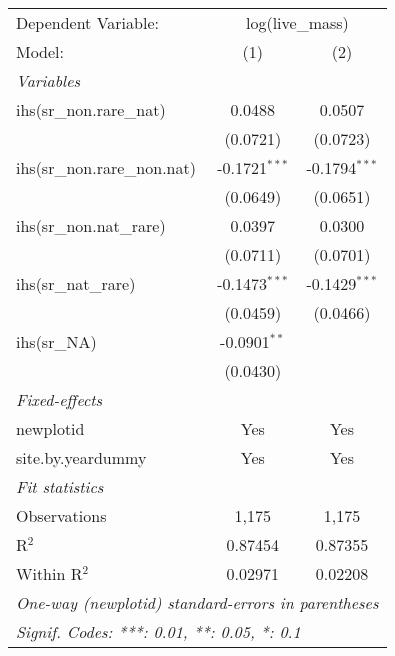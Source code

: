 \begin{tabular}{lcc}
\tabularnewline\midrule\midrule
Dependent Variable:&\multicolumn{2}{c}{log(live\_mass)}\\
Model:&(1) & (2)\\
\midrule \emph{Variables}&   &  \\
ihs(sr\_non.rare\_nat)&0.0488 & 0.0507\\
  &(0.0721) & (0.0723)\\
ihs(sr\_non.rare\_non.nat)&-0.1721$^{***}$ & -0.1794$^{***}$\\
  &(0.0649) & (0.0651)\\
ihs(sr\_non.nat\_rare)&0.0397 & 0.0300\\
  &(0.0711) & (0.0701)\\
ihs(sr\_nat\_rare)&-0.1473$^{***}$ & -0.1429$^{***}$\\
  &(0.0459) & (0.0466)\\
ihs(sr\_NA)&-0.0901$^{**}$ &   \\
  &(0.0430) &   \\
\midrule \emph{Fixed-effects}&   &  \\
newplotid & Yes & Yes\\
site.by.yeardummy & Yes & Yes\\
\midrule \emph{Fit statistics}&  & \\
Observations & 1,175&1,175\\
R$^2$ & 0.87454&0.87355\\
Within R$^2$ & 0.02971&0.02208\\
\midrule\midrule\multicolumn{3}{l}{\emph{One-way (newplotid) standard-errors in parentheses}}\\
\multicolumn{3}{l}{\emph{Signif. Codes: ***: 0.01, **: 0.05, *: 0.1}}\\
\end{tabular}


